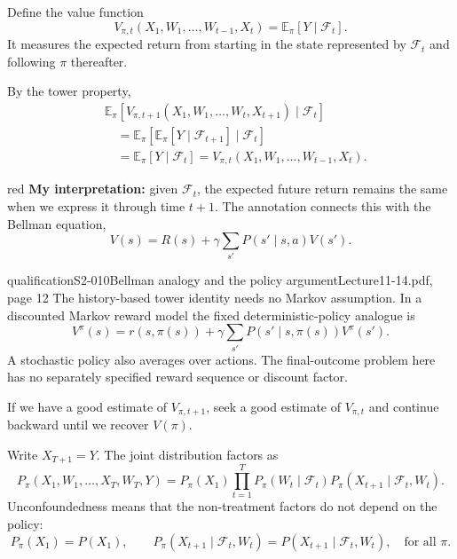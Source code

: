 Define the value function
\[
 V_{\pi,t}(X_1,W_1,\ldots,W_{t-1},X_t)
 =\mathbb E_\pi[Y\mid\mathcal F_t].
\]
It measures the expected return from starting in the state represented by $\mathcal F_t$ and following $\pi$ thereafter. 

By the tower property,
\begin{align*}
 &\mathbb E_\pi[V_{\pi,t+1}(X_1,W_1,\ldots,W_t,X_{t+1})\mid\mathcal F_t]\\
 &\quad=\mathbb E_\pi[\mathbb E_\pi[Y\mid\mathcal F_{t+1}]\mid\mathcal F_t]\\
 &\quad=\mathbb E_\pi[Y\mid\mathcal F_t]
 =V_{\pi,t}(X_1,W_1,\ldots,W_{t-1},X_t).\tag{12.6}
\end{align*}
\begin{inkblock}{red}
\textbf{My interpretation:} given $\mathcal F_t$, the expected future return remains the same when we express it through time $t+1$. The annotation connects this with the Bellman equation,
\[
 V(s)=R(s)+\gamma\sum_{s'}P(s'\mid s,a)V(s').
\]

\end{inkblock}

\begin{reviewnote}{qualification}{S2-010}{Bellman analogy and the policy argument}{Lecture11-14.pdf, page 12}
The history-based tower identity needs no Markov assumption. In a discounted Markov reward model the fixed deterministic-policy analogue is
\[
 V^\pi(s)=r(s,\pi(s))+\gamma\sum_{s'}P(s'\mid s,\pi(s))V^\pi(s').
\]
A stochastic policy also averages over actions. The final-outcome problem here has no separately specified reward sequence or discount factor.
\end{reviewnote}

If we have a good estimate of $V_{\pi,t+1}$, seek a good estimate of $V_{\pi,t}$ and continue backward until we recover $V(\pi)$.

Write $X_{T+1}=Y$. The joint distribution factors as
\[
 P_\pi(X_1,W_1,\ldots,X_T,W_T,Y)
 =P_\pi(X_1)\prod_{t=1}^T
 P_\pi(W_t\mid\mathcal F_t)
 P_\pi(X_{t+1}\mid\mathcal F_t,W_t).
\]
Unconfoundedness means that the non-treatment factors do not depend on the policy:
\[
 P_\pi(X_1)=P(X_1),\qquad
 P_\pi(X_{t+1}\mid\mathcal F_t,W_t)
 =P(X_{t+1}\mid\mathcal F_t,W_t),\quad\text{for all }\pi.
\]

